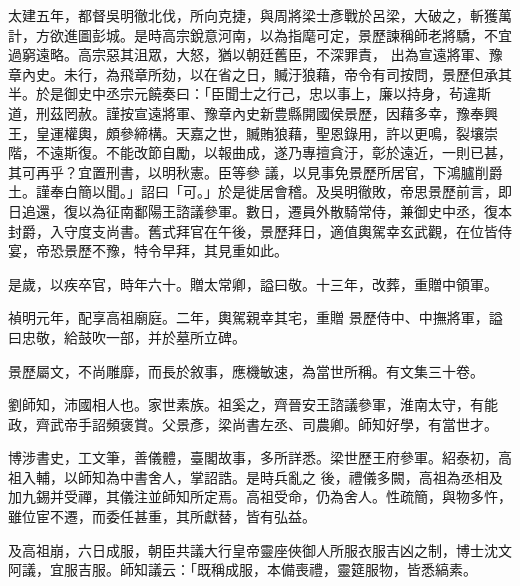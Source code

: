 \begin{pinyinscope}
 太建五年，都督吳明徹北伐，所向克捷，與周將梁士彥戰於呂梁，大破之，斬獲萬計，方欲進圖彭城。是時高宗銳意河南，以為指麾可定，景歷諫稱師老將驕，不宜過窮遠略。高宗惡其沮眾，大怒，猶以朝廷舊臣，不深罪責，
 出為宣遠將軍、豫章內史。未行，為飛章所劾，以在省之日，贓汙狼藉，帝令有司按問，景歷但承其半。於是御史中丞宗元饒奏曰：「臣聞士之行己，忠以事上，廉以持身，茍違斯道，刑茲罔赦。謹按宣遠將軍、豫章內史新豊縣開國侯景歷，因藉多幸，豫奉興王，皇運權輿，頗參締構。天嘉之世，贓賄狼藉，聖恩錄用，許以更鳴，裂壤崇階，不遠斯復。不能改節自勵，以報曲成，遂乃專擅貪汙，彰於遠近，一則已甚，其可再乎？宜置刑書，以明秋憲。臣等參
 議，以見事免景歷所居官，下鴻臚削爵土。謹奉白簡以聞。」詔曰「可。」於是徙居會稽。及吳明徹敗，帝思景歷前言，即日追還，復以為征南鄱陽王諮議參軍。數日，遷員外散騎常侍，兼御史中丞，復本封爵，入守度支尚書。舊式拜官在午後，景歷拜日，適值輿駕幸玄武觀，在位皆侍宴，帝恐景歷不豫，特令早拜，其見重如此。



 是歲，以疾卒官，時年六十。贈太常卿，謚曰敬。十三年，改葬，重贈中領軍。



 禎明元年，配享高祖廟庭。二年，輿駕親幸其宅，重贈
 景歷侍中、中撫將軍，謚曰忠敬，給鼓吹一部，并於墓所立碑。



 景歷屬文，不尚雕靡，而長於敘事，應機敏速，為當世所稱。有文集三十卷。



 劉師知，沛國相人也。家世素族。祖奚之，齊晉安王諮議參軍，淮南太守，有能政，齊武帝手詔頻褒賞。父景彥，梁尚書左丞、司農卿。師知好學，有當世才。



 博涉書史，工文筆，善儀體，臺閣故事，多所詳悉。梁世歷王府參軍。紹泰初，高祖入輔，以師知為中書舍人，掌詔誥。是時兵亂之
 後，禮儀多闕，高祖為丞相及加九錫并受禪，其儀注並師知所定焉。高祖受命，仍為舍人。性疏簡，與物多忤，雖位宦不遷，而委任甚重，其所獻替，皆有弘益。



 及高祖崩，六日成服，朝臣共議大行皇帝靈座俠御人所服衣服吉凶之制，博士沈文阿議，宜服吉服。師知議云：「既稱成服，本備喪禮，靈筵服物，皆悉縞素。




\end{pinyinscope}
